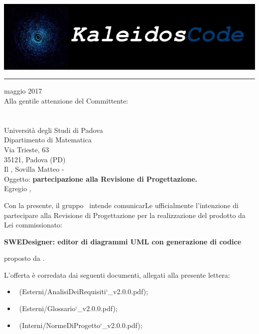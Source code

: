 \documentclass[a4paper,12pt]{article}
\author{KaleidosCode}
\date{01/04/2017}	%
\begin{document}
	\begin{titlepage}
		\includegraphics[scale=0.2]{../../../Immagini/KaleidosCodeLogo.png}
		\hrule
		\vspace{1.2cm}
		 maggio 2017\\
		\vspace{0.4cm}
		Alla gentile attenzione del Committente:\\
		\vardanega\\
		\cardin\\
		Università degli Studi di Padova\\
		Dipartimento di Matematica\\
		Via Trieste, 63\\
		35121, Padova (PD)\\
		\vspace{1.2cm}
		\flushleft Il \responsabilediprogetto, Sovilla Matteo - \kaleidoscode\\
		\vspace{0.4cm}
		Oggetto: \textbf{partecipazione alla Revisione di Progettazione.}\\
		\vspace{1cm}
		Egregio \vardanega,\\
		\vspace{0.4cm}
		\par Con la presente, il gruppo \kaleidoscode\ intende comunicarLe ufficialmente l'intenzione di partecipare alla Revisione
		di Progettazione per la realizzazione del prodotto da Lei commissionato:
		\begin{center}
			\textbf{SWEDesigner: editor di diagrammi UML con generazione di codice} 
		\end{center}
		proposto da \proponente.
		\par L'offerta è corredata dai seguenti documenti, allegati alla presente lettera:
		\begin{itemize}
			\item \analisideirequisitiRP\ (Esterni/AnalisiDeiRequisiti\char`_v2.0.0.pdf);
			\item \glossarioRP\ (Esterni/Glossario\char`_v2.0.0.pdf);
			\item \normediprogettoRP\ (Interni/NormeDiProgetto\char`_v2.0.0.pdf);

\end{itemize}
\end{titlepage}
\end{document}
